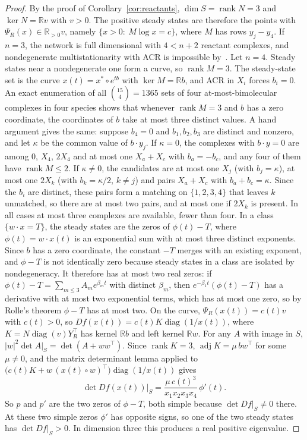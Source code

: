 \documentclass[11pt]{amsart}
\theoremstyle{definition}
\theoremstyle{remark}
\newcommand{\R}{\mathbb R}
\newcommand{\Rpos}{\mathbb R_{>0}}
\begin{document}
\begin{proof}
By the proof of Corollary~\ref{cor:reactants}, $\dim S=\operatorname{rank}N=3$ and $\ker N=\R v$ with $v>0$. The positive steady states are therefore the points with $\Psi_R(x)\in\Rpos v$, namely $\{x>0:\ M\log x=c\}$, where $M$ has rows $y_j-y_4$. If $n=3$, the network is full dimensional with $4<n+2$ reactant complexes, and nondegenerate multistationarity with ACR is impossible by~\cite[Theorem~1.2(4)]{kns2024}. Let $n=4$. Steady states near a nondegenerate one form a curve, so $\operatorname{rank}M=3$. The steady-state set is the curve $x(t)=x^*\circ e^{tb}$ with $\ker M=\R b$, and ACR in $X_i$ forces $b_i=0$. An exact enumeration of all $\binom{15}{4}=1365$ sets of four at-most-bimolecular complexes in four species shows that whenever $\operatorname{rank}M=3$ and $b$ has a zero coordinate, the coordinates of $b$ take at most three distinct values. A hand argument gives the same: suppose $b_4=0$ and $b_1,b_2,b_3$ are distinct and nonzero, and let $\kappa$ be the common value of $b\cdot y_j$. If $\kappa=0$, the complexes with $b\cdot y=0$ are among $0$, $X_4$, $2X_4$ and at most one $X_a+X_c$ with $b_a=-b_c$, and any four of them have $\operatorname{rank}M\le2$. If $\kappa\neq0$, the candidates are at most one $X_j$ (with $b_j=\kappa$), at most one $2X_k$ (with $b_k=\kappa/2$, $k\ne j$) and pairs $X_a+X_c$ with $b_a+b_c=\kappa$. Since the $b_i$ are distinct, these pairs form a matching on $\{1,2,3,4\}$ that leaves $k$ unmatched, so there are at most two pairs, and at most one if $2X_k$ is present. In all cases at most three complexes are available, fewer than four. In a class $\{w\cdot x=T\}$, the steady states are the zeros of $\phi(t)-T$, where $\phi(t)=w\cdot x(t)$ is an exponential sum with at most three distinct exponents. Since $b$ has a zero coordinate, the constant $-T$ merges with an existing exponent, and $\phi-T$ is not identically zero because steady states in a class are isolated by nondegeneracy. It therefore has at most two real zeros: if $\phi(t)-T=\sum_{m\le3}A_me^{\beta_mt}$ with distinct $\beta_m$, then $e^{-\beta_1t}(\phi(t)-T)$ has a derivative with at most two exponential terms, which has at most one zero, so by Rolle's theorem $\phi-T$ has at most two. On the curve, $\Psi_R(x(t))=c(t)v$ with $c(t)>0$, so $Df(x(t))=c(t)K\operatorname{diag}(1/x(t))$, where $K=N\operatorname{diag}(v)Y_R^\top$ has kernel $\R b$ and left kernel $\R w$. For any $A$ with image in $S$, $|w|^2\det A|_S=\det(A+ww^\top)$. Since $\operatorname{rank}K=3$, $\operatorname{adj}K=\mu\,bw^\top$ for some $\mu\neq0$, and the matrix determinant lemma applied to $\bigl(c(t)K+w\,(x(t)\circ w)^\top\bigr)\operatorname{diag}(1/x(t))$ gives
\[
 \det Df(x(t))|_S=\frac{\mu\,c(t)^{3}}{x_1x_2x_3x_4}\,\phi'(t).
\]
So $p$ and $p'$ are the two zeros of $\phi-T$, both simple because $\det Df|_S\neq0$ there. At these two simple zeros $\phi'$ has opposite signs, so one of the two steady states has $\det Df|_S>0$. In dimension three this produces a real positive eigenvalue.
\end{proof}
\end{document}
